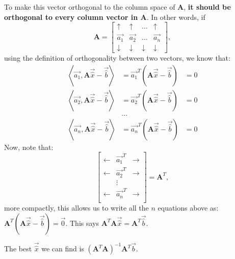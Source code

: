 \begin{enumerate}
{To make this vector orthogonal to the column space of $\mathbf{A}$, \textbf{it should be orthogonal to every column vector in $\mathbf{A}$}.
In other words, if $$
\mathbf{A} = 
\begin{bmatrix}
\uparrow & \uparrow & \hdots  & \uparrow \\
\vec{a_1} & \vec{a_2} & \hdots & \vec{a_n} \\
\downarrow & \downarrow & \downarrow & \downarrow
\end{bmatrix},
$$ using the definition of orthogonality between two vectors, we know that:
$$\begin{aligned}
\left \langle \vec{a_1}, \mathbf{A}\vec{\hat{x}} - \vec{\hat{b}} \right \rangle &= \vec{a_1}^T(\mathbf{A}\vec{\hat{x}} - \vec{\hat{b}}) &= 0 \\
\left \langle \vec{a_2}, \mathbf{A}\vec{\hat{x}} - \vec{\hat{b}} \right \rangle &= \vec{a_2}^T(\mathbf{A}\vec{\hat{x}} - \vec{\hat{b}}) &= 0 \\
& \hdots & \\
\left \langle \vec{a_n}, \mathbf{A}\vec{\hat{x}} - \vec{\hat{b}} \right \rangle &= \vec{a_n}^T(\mathbf{A}\vec{\hat{x}} - \vec{\hat{b}}) &= 0
\end{aligned}$$
Now, note that:
$$
\begin{bmatrix}
\leftarrow & \vec{a_1}^T & \rightarrow \\
\leftarrow & \vec{a_2}^T & \rightarrow \\
           & \vdots & \\
\leftarrow & \vec{a_n}^T & \rightarrow \\
\end{bmatrix} = \mathbf{A}^T, 
$$
more compactly, this allows us to write all the $n$ equations above as: $\mathbf{A}^T(\mathbf{A}\vec{\hat{x}} - \vec{\hat{b}}) = \vec{0}$. This says $\mathbf{A}^T\mathbf{A}\vec{\hat{x}} = \mathbf{A}^T\vec{\hat{b}}$.

The best $\vec{\hat{x}}$ we can find is $(\mathbf{A}^T\mathbf{A})^{-1}\mathbf{A}^T\vec{b}$.
}

    
\end{enumerate}
